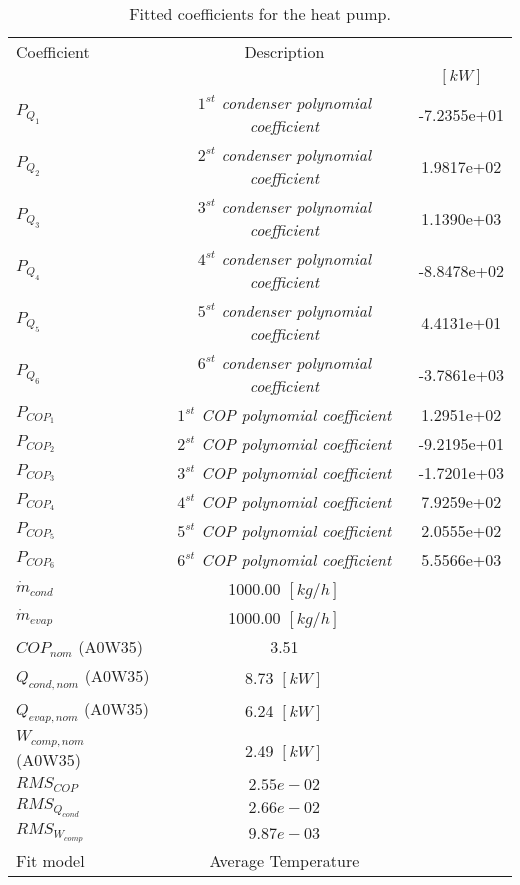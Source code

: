 \documentclass[english]{SPFShortReport}
\author{Dani Carbonell}
\begin{document}
\begin{table}[!ht]
\begin{small}
\caption{Fitted coefficients for the heat pump.}
\begin{center}
\resizebox{12cm}{!} 
{
\begin{tabular}{l | c c } 
\hline
\hline
Coefficient &Description & \\ 
 & &$[kW]$\\ 
\hline
$P_{Q_{1}}$ & \emph{$1^{st}$ condenser polynomial coefficient}  & -7.2355e+01    \\ 
$P_{Q_{2}}$ & \emph{$2^{st}$ condenser polynomial coefficient}  & 1.9817e+02    \\ 
$P_{Q_{3}}$ & \emph{$3^{st}$ condenser polynomial coefficient}  & 1.1390e+03    \\ 
$P_{Q_{4}}$ & \emph{$4^{st}$ condenser polynomial coefficient}  & -8.8478e+02    \\ 
$P_{Q_{5}}$ & \emph{$5^{st}$ condenser polynomial coefficient}  & 4.4131e+01    \\ 
$P_{Q_{6}}$ & \emph{$6^{st}$ condenser polynomial coefficient}  & -3.7861e+03    \\ 
\hline
$P_{COP_{1}}$ & \emph{$1^{st}$ COP polynomial coefficient}  & 1.2951e+02    \\ 
$P_{COP_{2}}$ & \emph{$2^{st}$ COP polynomial coefficient}  & -9.2195e+01    \\ 
$P_{COP_{3}}$ & \emph{$3^{st}$ COP polynomial coefficient}  & -1.7201e+03    \\ 
$P_{COP_{4}}$ & \emph{$4^{st}$ COP polynomial coefficient}  & 7.9259e+02    \\ 
$P_{COP_{5}}$ & \emph{$5^{st}$ COP polynomial coefficient}  & 2.0555e+02    \\ 
$P_{COP_{6}}$ & \emph{$6^{st}$ COP polynomial coefficient}  & 5.5566e+03    \\ 
\hline
$\dot m_{cond}$ & 1000.00 $[kg/h]$ \\ 
$\dot m_{evap}$ & 1000.00 $[kg/h]$ \\ 
\hline
$COP_{nom}$ (A0W35)& 3.51 \\ 
$Q_{cond,nom}$ (A0W35)& 8.73 $[kW]$\\ 
$Q_{evap,nom}$ (A0W35)& 6.24 $[kW]$\\ 
$W_{comp,nom}$ (A0W35)& 2.49 $[kW]$\\ 
\hline
 $RMS_{COP}$ & $2.55e-02$ \\ 
 $RMS_{Q_{cond}}$ & $2.66e-02$ \\ 
 $RMS_{W_{comp}}$ & $9.87e-03$ \\ 
\hline
Fit model & Average Temperature\\ 
\hline
\hline
\end{tabular}
}
\label{CoefTable}
\end{center}
\end{small}
\end{table}
\end{document}
